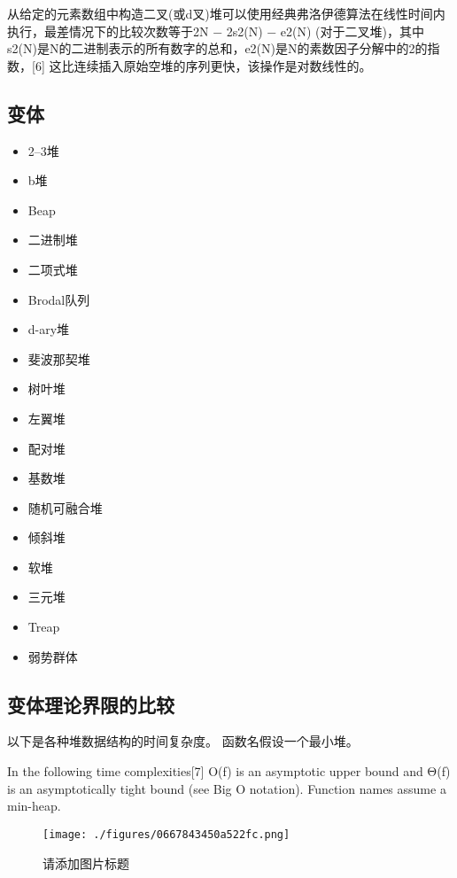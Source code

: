 从给定的元素数组中构造二叉(或d叉)堆可以使用经典弗洛伊德算法在线性时间内执行，最差情况下的比较次数等于2N − 2s2(N) − e2(N) (对于二叉堆)，其中 s2(N)是N的二进制表示的所有数字的总和，e2(N)是N的素数因子分解中的2的指数，[6] 这比连续插入原始空堆的序列更快，该操作是对数线性的。

\subsection{变体}
\begin{itemize}
\item 2–3堆
\item b堆
\item Beap
\item 二进制堆
\item 二项式堆
\item Brodal队列
\item d-ary堆
\item 斐波那契堆
\item 树叶堆
\item 左翼堆
\item 配对堆
\item 基数堆
\item 随机可融合堆
\item 倾斜堆
\item 软堆
\item 三元堆
\item Treap
\item 弱势群体
\end{itemize}

\subsection{变体理论界限的比较}
以下是各种堆数据结构的时间复杂度。 函数名假设一个最小堆。

In the following time complexities[7] O(f) is an asymptotic upper bound and Θ(f) is an asymptotically tight bound (see Big O notation). Function names assume a min-heap.
\begin{figure}[ht]
\centering
\texttt{[image: ./figures/0667843450a522fc.png]}
\caption{请添加图片标题} \label{fig_DUI_2}
\end{figure}

